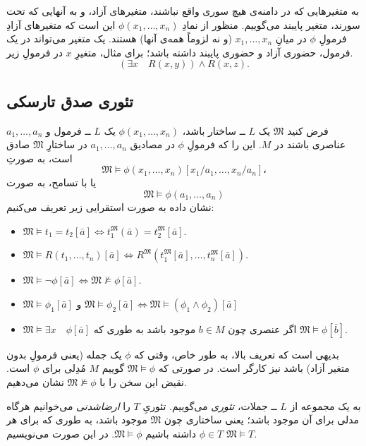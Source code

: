 \documentclass[12pt,a4paper]{report}
\theoremstyle{colorhead}
\begin{document}
به متغیرهایی که در دامنه‌ی هیچ سوری واقع نباشند، متغیرهای آزاد، و به آنهایی که 
تحت سورند، متغیر پایبند می‌گوییم. منظور از نمادِ
$\phi(x_1,\ldots,x_n)$
این است که متغیرهای آزادِ 
فرمولِ
$\phi$
در میانِ
$x_1,\ldots,x_n$
(و نه لزوماً‌ همه‌ی آنها)
هستند. یک متغیر می‌تواند در یک فرمول،‌ حضوری آزاد و حضوری پایبند داشته باشد؛ برای مثال، متغیرِ
$x$
در فرمولِ زیر.
\[
(\exists x\quad R(x,y))\wedge R(x,z).
\]
\subsection{ تئوری صدق تارسکی}
فرض کنید
$\mathfrak{M}$
یک 
$L$ ــ‌
ساختار باشد،
$\phi(x_1,\ldots,x_n)$
یک
$L$
ــ‌ فرمول و
$a_1,\ldots,a_n$
عناصری باشند
در
$M$.
 این را که فرمولِ
 $\phi$
 در مصادیق
 $a_1,\ldots,a_n$
 در ساختارِ
 $\mathfrak{M}$
 صادق است، به صورتِ
 \[
 \mathfrak{M}\models \phi(x_1,\ldots,x_n)[x_1/a_1,\ldots, x_n/a_n]،
 \]
 یا با تسامح،‌ به صورت
 \[
 \mathfrak{M}\models \phi(a_1,\ldots,a_n)
 \]
 نشان داده به صورت استقرایی زیر تعریف می‌کنیم:
\begin{itemize}
\item 
$\mathfrak{M}\models t_1=t_2[\bar{a}]\Leftrightarrow t_1^\mathfrak{M}(\bar{a})=t_2^\mathfrak{M}[\bar{a}]$.
\item 
$\mathfrak{M}\models R(t_1,\ldots,t_n)[\bar{a}]\Leftrightarrow 
R^\mathfrak{M}(t_1^\mathfrak{M}[\bar{a}],\ldots,t_n^\mathfrak{M}[\bar{a}])$.
\item 
$\mathfrak{M}\models \neg \phi[\bar{a}]\Leftrightarrow \mathfrak{M}\not\models
\phi[\bar{a}]$.
\item 
$\mathfrak{M}\models \phi_1[\bar{a}] \text{ و }
\mathfrak{M}\models \phi_2[\bar{a}]
\Leftrightarrow
\mathfrak{M}\models (\phi_1\wedge\phi_2)[\bar{a}]$
\item 
$\mathfrak{M}\models \exists x \quad \phi[\bar{a}]$
اگر عنصری چون
$b\in M$
موجود باشد به طوری که
$\mathfrak{M}\models \phi[\bar{b}]$.
\end{itemize}
\par 
بدیهی است که تعریف بالا، به طور خاص،‌ وقتی که
$\phi$
یک جمله (یعنی فرمولِ بدون متغیر آزاد‌) باشد نیز کارگر است.
در صورتی که
$\mathfrak{M}\models \phi$
گوییم
$M$
مُدِلی برای 
$\phi$
است. نقیض این سخن را با
$\mathfrak{M}\not\models \phi$
نشان می‌دهیم. 
\par 
به یک مجموعه‌ از
$L$ ــ
جملات، 
\textit{تئوری}
می‌گوییم. تئوریِ
$T$
را 
\textit{ارضاشدنی }
می‌خوانیم هرگاه مدلی برای آن موجود باشد؛ یعنی ساختاری چون
$\mathfrak{M}$
موجود باشد،‌ به طوری که برای 
هر
$\phi\in T$
داشته باشیم
$\mathfrak{M}\models \phi$.
در این صورت می‌نویسیم
$\mathfrak{M}\models T$.
\end{document}
